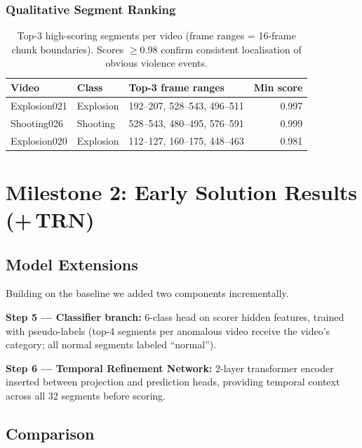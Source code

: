 \documentclass[11pt]{article}
\begin{document}
\subsubsection{Qualitative Segment Ranking}

\begin{table}[h]
\centering
\small
\begin{tabular}{llp{3.0cm}r}
\toprule
\textbf{Video} & \textbf{Class} & \textbf{Top-3 frame ranges} &
                 \textbf{Min score} \\
\midrule
Explosion021 & Explosion & 192--207, 528--543, 496--511 & 0.997 \\
Shooting026  & Shooting  & 528--543, 480--495, 576--591 & 0.999 \\
Explosion020 & Explosion & 112--127, 160--175, 448--463 & 0.981 \\
\bottomrule
\end{tabular}
\caption{Top-3 high-scoring segments per video (frame ranges = 16-frame chunk
         boundaries). Scores $\geq\!0.98$ confirm consistent localisation of
         obvious violence events.}
\label{tab:seg_ranking}
\end{table}

\section{Milestone 2: Early Solution Results (+\,TRN)}

\subsection{Model Extensions}

Building on the baseline we added two components incrementally.

\textbf{Step 5 --- Classifier branch:}
6-class head on scorer hidden features, trained with pseudo-labels (top-4
segments per anomalous video receive the video's category; all normal segments
labeled ``normal'').

\textbf{Step 6 --- Temporal Refinement Network:}
2-layer transformer encoder inserted between projection and prediction heads,
providing temporal context across all 32 segments before scoring.

\subsection{Comparison}
\end{document}
